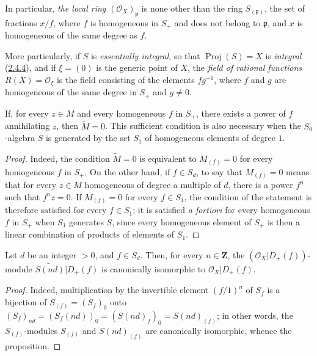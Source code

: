 In particular, \emph{the local ring $(\mathcal{O}_X)_\mathfrak{p}$} is none
other than the ring $S_{(\mathfrak{p})}$, the set of fractions $x/f$, where
$f$ is homogeneous in $S_+$ and does not belong to $\mathfrak{p}$, and $x$
is homogeneous of the same degree as $f$.

More particularly, if $S$ is \emph{essentially integral}, so
that $\operatorname{Proj}(S)=X$ is \emph{integral}
(\hyperref[II.2.4.4]{2.4.4}), and if $\xi=(0)$ is the generic point of
$X$, the \emph{field of rational functions}
$R(X)=\mathcal{O}_\xi$ is the field consisting of the elements $fg^{-1}$,
where $f$ and $g$ are homogeneous of the same degree in $S_+$ and $g\neq0$.

\begin{proposition}[2.5.6]
\label{II.2.5.6}
If, for every $z\in M$ and every homogeneous $f$ in $S_+$, there exists a
power of $f$ annihilating $z$, then $\widetilde{M}=0$. This sufficient
condition is also necessary when the $S_0$-algebra $S$ is generated
by the set $S_1$ of homogeneous elements of degree $1$.
\end{proposition}

\begin{proof}
Indeed, the condition $\widetilde{M}=0$ is equivalent to $M_{(f)}=0$ for
every homogeneous $f$ in $S_+$. On the other hand, if $f\in S_d$, to say that
$M_{(f)}=0$ means that for every $z\in M$ homogeneous of degree a multiple
of $d$, there is a power $f^n$ such that $f^nz=0$. If $M_{(f)}=0$ for every
$f\in S_1$, the condition of the statement is therefore satisfied for every
$f\in S_1$; it is satisfied \emph{a fortiori} for every homogeneous $f$ in
$S_+$ when $S_1$ generates $S$, since every homogeneous element of $S_+$
is then a linear combination of products of elements of $S_1$.
\end{proof}

\begin{proposition}[2.5.7]
\label{II.2.5.7}
Let $d$ be an integer $>0$, and $f\in S_d$. Then, for every
$n\in\mathbf{Z}$, the $(\mathcal{O}_X|D_+(f))$-module
$\widetilde{S(nd)}|D_+(f)$ is canonically isomorphic to
$\mathcal{O}_X|D_+(f)$.
\end{proposition}

\begin{proof}
Indeed, multiplication by the invertible element $(f/1)^n$ of $S_f$
is a bijection of $S_{(f)}=(S_f)_0$ onto
$(S_f)_{nd}=(S_f(nd))_0=(S(nd)_f)_0=S(nd)_{(f)}$; in other words, the
$S_{(f)}$-modules $S_{(f)}$ and $S(nd)_{(f)}$ are canonically
isomorphic, whence the proposition.
\end{proof}

